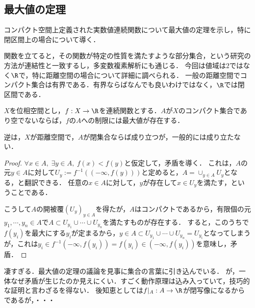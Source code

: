 \documentclass[uplatex,dvipdfmx]{jsreport}
\begin{document}
\subsection{最大値の定理}

\begin{tcolorbox}[colframe=ForestGreen, colback=ForestGreen!10!white, breakable ,colbacktitle=ForestGreen!40!white, coltitle=black,fonttitle=\bfseries\sffamily
    ,title=コンパクト集合とは，最大値を持つような部分集合のこと．正則領域みたいな．]
    コンパクト空間上定義された実数値連続関数について最大値の定理を示し，特に閉区間上の場合について導く．

    関数を立てると，その関数が特定の性質を満たすような部分集合，という研究の方法が連結性と一致するし，多変数複素解析にも通じる．
    今回は値域は$2$ではなく$\R$で，特に距離空間の場合について詳細に調べられる．
    一般の距離空間でコンパクト集合は有界である．有界ならばなんでも良いわけではなく，$\R$では閉区間である．
\end{tcolorbox}

\begin{proposition}\label{prop-maximum-value-theorem}
    $X$を位相空間とし，$f:X\to\R$を連続関数とする．$A$が$X$のコンパクト集合であり空でないならば，$f$の$A$への制限には最大値が存在する．
\end{proposition}
\begin{remark}
    逆は，$X$が距離空間で，$A$が閉集合ならば成り立つが，一般的には成り立たない．
\end{remark}
\begin{proof}
    $\forall x\in A,\;\exists y\in A,\; f(x)<f(y)$と仮定して，矛盾を導く．
    これは，$A$の元$y\in A$に対して$U_y:=f^{-1}((-\infty,f(y)))$と定めると，$A=\cup_{y\in A}U_y$となる，と翻訳できる．
    任意の$x\in A$に対して，$y$が存在して$x\in U_y$を満たす，ということである．

    こうして$A$の開被覆$(U_y)_{y\in A}$を得たが，$A$はコンパクトであるから，有限個の元$y_1,\cdots,y_n\in A$で$A\subset U_{y_1}\cup\cdots\cup U_{y_n}$を満たすものが存在する．
    すると，このうちで$f(y_i)$を最大にする$y_i$が定まるから，$y\in A\subset U_{y_1}\cup\cdots\cup U_{y_n}=U_{y_i}$となってしまうが，これは$y_i\in f^{-1}(-\infty,f(y_i))=f(y_i)\in(-\infty,f(y_i))$を意味し，矛盾．
\end{proof}
\begin{remarks}
    凄すぎる．最大値の定理の議論を見事に集合の言葉に引き込んでいる．
    が，一体なぜ矛盾が生じたのか見えにくい．すごく動作原理は込み入っていて，技巧的な証明と言わざるを得ない．
    後知恵としては$f|_A:A\to\R$が閉写像になるからであるが，・・・
\end{remarks}
\end{document}

